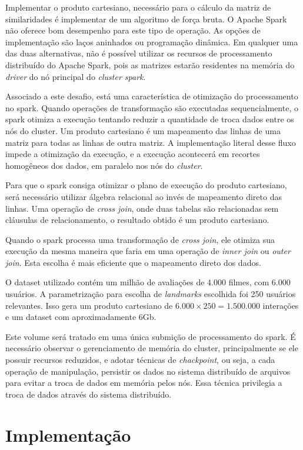 \documentclass[12pt]{article}
\begin{document}
Implementar o produto cartesiano, necessário para o cálculo da matriz de similaridades é implementar de um algoritmo de força bruta. O Apache Spark não oferece bom desempenho para este tipo de operação. As opções de implementação são laços aninhados ou programação dinâmica. Em qualquer uma das duas alternativas, não é possível utilizar os recursos de processamento distribuído do Apache Spark, pois as matrizes estarão residentes na memória do \textit{driver} do nó principal do \textit{cluster spark}.

Associado a este desafio, está uma característica de otimização do processamento no spark. Quando operações de transformação são executadas sequencialmente, o spark otimiza a execução tentando reduzir a quantidade de troca dados entre os nós do cluster. Um produto cartesiano é um mapeamento das linhas de uma matriz para todas as linhas de outra matriz. A implementação literal desse fluxo impede a otimização da execução, e a execução acontecerá em recortes homogêneos dos dados, em paralelo nos nós do \textit{cluster}.

Para que o spark consiga otimizar o plano de execução do produto cartesiano, será necessário utilizar álgebra relacional ao invés de mapeamento direto das linhas. Uma operação de \textit{cross join}, onde duas tabelas são relacionadas sem cláusulas de relacionamento, o resultado obtido é um produto cartesiano.

Quando o spark processa uma transformação de \textit{cross join}, ele otimiza sua execução da mesma maneira que faria em uma operação de \textit{inner join} ou \textit{outer join}. Esta escolha é mais eficiente que o mapeamento direto dos dados.

O dataset utilizado contém um milhão de avaliações de 4.000 filmes, com 6.000 usuários. A parametrização para escolha de \textit{landmarks} escolhida foi 250 usuários relevantes. Isso gera um produto cartesiano de $6.000 \times 250 = 1.500.000$ interações e um dataset com aproximadamente 6Gb.

Este volume será tratado em uma única submição de processamento do spark. É necessário observar o gerenciamento de memória do cluster, principalmente se ele possuir recursos reduzidos, e adotar técnicas de \textit{chackpoint}, ou seja, a cada operação de manipulação, persistir os dados no sistema distribuído de arquivos para evitar a troca de dados em memória pelos nós. Essa técnica privilegia a troca de dados através do sistema distribuído.

\section{Implementação}\label{impl}
\end{document}
